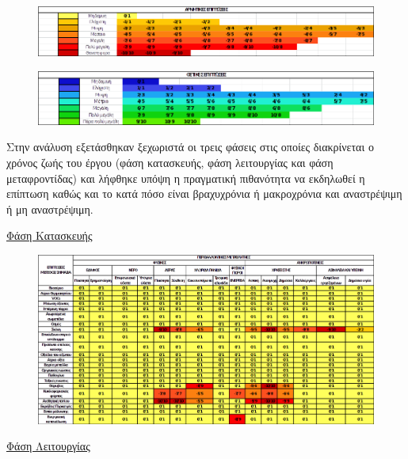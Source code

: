 \documentclass[12pt]{article}
\begin{document}
		\begin{figure} [H]
		\begin{center}
			\includegraphics [scale = 0.60] {table28.png}
		\end{center}
	\end{figure}
	
	\begin{figure} [H]
		\begin{center}
			\includegraphics [scale = 0.60] {table29.png}
		\end{center}
	\end{figure}

	Στην ανάλυση εξετάσθηκαν ξεχωριστά οι τρεις φάσεις στις οποίες διακρίνεται ο χρόνος ζωής του έργου (φάση κατασκευής, φάση λειτουργίας και φάση μεταφροντίδας) και λήφθηκε υπόψη η πραγματική πιθανότητα να εκδηλωθεί η επίπτωση καθώς και το κατά πόσο είναι βραχυχρόνια ή μακροχρόνια και αναστρέψιμη ή μη αναστρέψιμη.
	
	\underline{Φάση Κατασκευής}
	
	\begin{figure} [H]
		\begin{center}
			\includegraphics [scale = 0.60] {table30.png}
		\end{center}
	\end{figure}
	
	\underline{Φάση Λειτουργίας}
	
\end{document}
